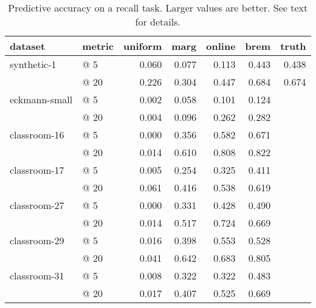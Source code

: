 \begin{table}[t]
\begin{center}
{\footnotesize
\begin{tabular}{llrrrrr}
  \hline
dataset & metric & uniform & marg & online & brem & truth \\ 
  \hline
synthetic-1 & @  5 & 0.060 & 0.077 & 0.113 & 0.443 & 0.438 \\ 
   & @ 20 & 0.226 & 0.304 & 0.447 & 0.684 & 0.674 \\ 
  eckmann-small & @  5 & 0.002 & 0.058 & 0.101 & 0.124 &  \\ 
   & @ 20 & 0.004 & 0.096 & 0.262 & 0.282 &  \\ 
  classroom-16 & @  5 & 0.000 & 0.356 & 0.582 & 0.671 &  \\ 
   & @ 20 & 0.014 & 0.610 & 0.808 & 0.822 &  \\ 
  classroom-17 & @  5 & 0.005 & 0.254 & 0.325 & 0.411 &  \\ 
   & @ 20 & 0.061 & 0.416 & 0.538 & 0.619 &  \\ 
  classroom-27 & @  5 & 0.000 & 0.331 & 0.428 & 0.490 &  \\ 
   & @ 20 & 0.014 & 0.517 & 0.724 & 0.669 &  \\ 
  classroom-29 & @  5 & 0.016 & 0.398 & 0.553 & 0.528 &  \\ 
   & @ 20 & 0.041 & 0.642 & 0.683 & 0.805 &  \\ 
  classroom-31 & @  5 & 0.008 & 0.322 & 0.322 & 0.483 &  \\ 
   & @ 20 & 0.017 & 0.407 & 0.525 & 0.669 &  \\ 
   \hline
\end{tabular}
}
\caption{Predictive accuracy on a recall task.  Larger values are better.  See text for details.}
\label{tab:results}
\end{center}
\end{table}
